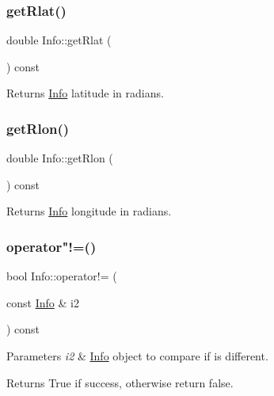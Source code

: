 \subsubsection{\texorpdfstring{get\+Rlat()}{getRlat()}}
{\footnotesize\ttfamily double Info\+::get\+Rlat (\begin{DoxyParamCaption}{ }\end{DoxyParamCaption}) const}

\begin{DoxyReturn}{Returns}
\hyperlink{class_info}{Info} latitude in radians. 
\end{DoxyReturn}
\mbox{\label{class_info_a829bd3485845e44a02078341a80238aa}} 
\subsubsection{\texorpdfstring{get\+Rlon()}{getRlon()}}
{\footnotesize\ttfamily double Info\+::get\+Rlon (\begin{DoxyParamCaption}{ }\end{DoxyParamCaption}) const}

\begin{DoxyReturn}{Returns}
\hyperlink{class_info}{Info} longitude in radians. 
\end{DoxyReturn}
\mbox{\label{class_info_ac54fc69d9e73807549757ae1a3a8731d}} 
\subsubsection{\texorpdfstring{operator"!=()}{operator!=()}}
{\footnotesize\ttfamily bool Info\+::operator!= (\begin{DoxyParamCaption}\item[{const \hyperlink{class_info}{Info} \&}]{i2 }\end{DoxyParamCaption}) const}


\begin{DoxyParams}{Parameters}
{\em i2} & \hyperlink{class_info}{Info} object to compare if is different.\\
\hline
\end{DoxyParams}
\begin{DoxyReturn}{Returns}
True if success, otherwise return false. 
\end{DoxyReturn}
\mbox{\label{class_info_ade9362e816fc6c393fbcefe49a3bd12f}} 
